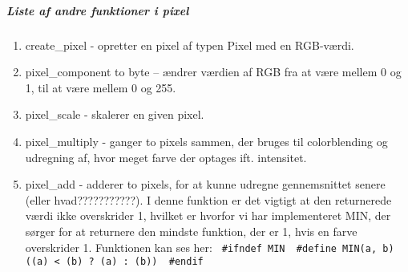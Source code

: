 \subparagraph{Liste af andre funktioner i pixel}
\begin{enumerate}

  \item create\_pixel - opretter en pixel af typen Pixel med en RGB-værdi.
  \item pixel\_component to byte – ændrer værdien af RGB fra at være mellem 0 og 1, til at være mellem 0 og 255.
  \item pixel\_scale - skalerer en given pixel.
  \item pixel\_multiply - ganger to pixels sammen, der bruges til colorblending og udregning af, hvor meget farve der optages 								  ift. intensitet.
  \item pixel\_add - adderer to pixels, for at kunne udregne gennemsnittet senere (eller hvad???????????). I denne funktion er 							 det vigtigt at den returnerede værdi ikke overskrider 1, hvilket er hvorfor vi har implementeret MIN, der 							 sørger for at returnere den mindste funktion, der er 1, hvis en farve overskrider 1. Funktionen kan ses her:
 \lstinline$
#ifndef MIN

#define MIN(a, b) ((a) < (b) ? (a) : (b))

#endif$  					

\end{enumerate}

